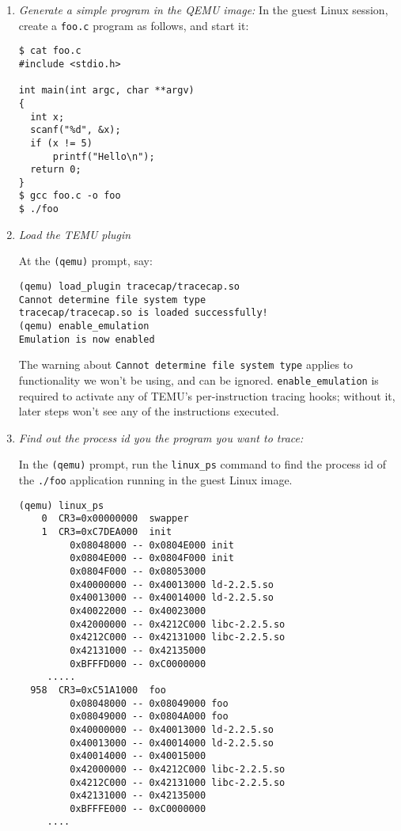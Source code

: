 \begin {enumerate}
  \item \emph {Generate a simple program in the QEMU image:}
    In the guest Linux session, create a \texttt{foo.c} program as
    follows, and start it:
\begin{Verbatim}[frame=lines, framesep=.5em]
$ cat foo.c
#include <stdio.h>

int main(int argc, char **argv)
{
  int x;
  scanf("%d", &x);
  if (x != 5)
      printf("Hello\n");
  return 0;
}
$ gcc foo.c -o foo
$ ./foo

\end{Verbatim}
\item \emph {Load the TEMU plugin}

At the \verb'(qemu)' prompt, say:
\begin{Verbatim}[frame=lines, framesep=.5em]
(qemu) load_plugin tracecap/tracecap.so
Cannot determine file system type
tracecap/tracecap.so is loaded successfully!
(qemu) enable_emulation
Emulation is now enabled
\end{Verbatim}

The warning about \verb'Cannot determine file system type' applies to
functionality we won't be using, and can be
ignored. \verb'enable_emulation' is required to activate any of TEMU's
per-instruction tracing hooks; without it, later steps won't see any
of the instructions executed.

\item \emph {Find out the process id you the program you want to trace:}

In the \verb'(qemu)' prompt, run the \texttt{linux\_ps} command to
find the process id of the \texttt{./foo} application running in the
guest Linux image.

\begin{Verbatim}[frame=lines, framesep=.5em]
(qemu) linux_ps
    0  CR3=0x00000000  swapper
    1  CR3=0xC7DEA000  init
         0x08048000 -- 0x0804E000 init
         0x0804E000 -- 0x0804F000 init
         0x0804F000 -- 0x08053000 
         0x40000000 -- 0x40013000 ld-2.2.5.so
         0x40013000 -- 0x40014000 ld-2.2.5.so
         0x40022000 -- 0x40023000 
         0x42000000 -- 0x4212C000 libc-2.2.5.so
         0x4212C000 -- 0x42131000 libc-2.2.5.so
         0x42131000 -- 0x42135000 
         0xBFFFD000 -- 0xC0000000 
	 .....
  958  CR3=0xC51A1000  foo
         0x08048000 -- 0x08049000 foo
         0x08049000 -- 0x0804A000 foo
         0x40000000 -- 0x40013000 ld-2.2.5.so
         0x40013000 -- 0x40014000 ld-2.2.5.so
         0x40014000 -- 0x40015000 
         0x42000000 -- 0x4212C000 libc-2.2.5.so
         0x4212C000 -- 0x42131000 libc-2.2.5.so
         0x42131000 -- 0x42135000 
         0xBFFFE000 -- 0xC0000000 
	 ....
\end{Verbatim}
  

\end{enumerate}
